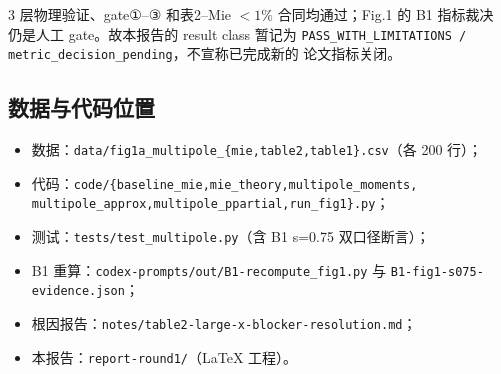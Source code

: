 3 层物理验证、gate①--③ 和表2--Mie $<1\%$ 合同均通过；Fig.1 的 B1 指标裁决
仍是人工 gate。故本报告的 result class 暂记为
\texttt{PASS\_WITH\_LIMITATIONS / metric\_decision\_pending}，不宣称已完成新的
论文指标关闭。

\subsection{数据与代码位置}

\begin{itemize}
  \item 数据：\texttt{data/fig1a\_multipole\_\{mie,table2,table1\}.csv}（各 200 行）；
  \item 代码：\texttt{code/\{baseline\_mie,mie\_theory,multipole\_moments,
        multipole\_approx,multipole\_ppartial,run\_fig1\}.py}；
  \item 测试：\texttt{tests/test\_multipole.py}（含 B1 s=0.75 双口径断言）；
  \item B1 重算：\texttt{codex-prompts/out/B1-recompute\_fig1.py} 与
        \texttt{B1-fig1-s075-evidence.json}；
  \item 根因报告：\texttt{notes/table2-large-x-blocker-resolution.md}；
  \item 本报告：\texttt{report-round1/}（LaTeX 工程）。
\end{itemize}
